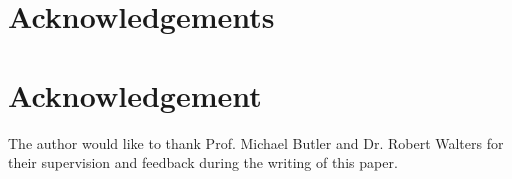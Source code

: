 \documentclass[12pt,journal,compsoc]{IEEEtran}
\begin{document}
\ifCLASSOPTIONcompsoc
  \section*{Acknowledgements}
\else
  \section*{Acknowledgement}
\fi

The author would like to thank Prof. Michael Butler and Dr. Robert Walters for their supervision and feedback during the writing of this paper.


\ifCLASSOPTIONcaptionsoff
  \newpage
\fi




%










\end{document}
